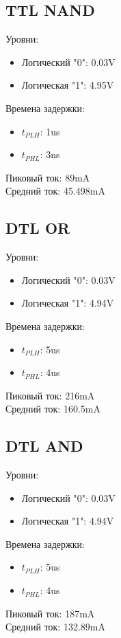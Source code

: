 \subsection{TTL NAND}
Уровни:
\begin{itemize}
    \item Логический "0": 0.03V
    \item Логическая "1": 4.95V
\end{itemize}
Времена задержки:
\begin{itemize}
    \item $t_{PLH}$: 1us
    \item $t_{PHL}$: 3ns
\end{itemize}
Пиковый ток: 89mA\\
Средний ток: 45.498mA


\subsection{DTL OR}
Уровни:
\begin{itemize}
    \item Логический "0": 0.03V
    \item Логическая "1": 4.94V
\end{itemize}
Времена задержки:
\begin{itemize}
    \item $t_{PLH}$: 5us
    \item $t_{PHL}$: 4us
\end{itemize}
Пиковый ток: 216mA\\
Средний ток: 160.5mA


\subsection{DTL AND}
Уровни:
\begin{itemize}
    \item Логический "0": 0.03V
    \item Логическая "1": 4.94V
\end{itemize}
Времена задержки:
\begin{itemize}
    \item $t_{PLH}$: 5us
    \item $t_{PHL}$: 4us
\end{itemize}
Пиковый ток: 187mA\\
Средний ток: 132.89mA


